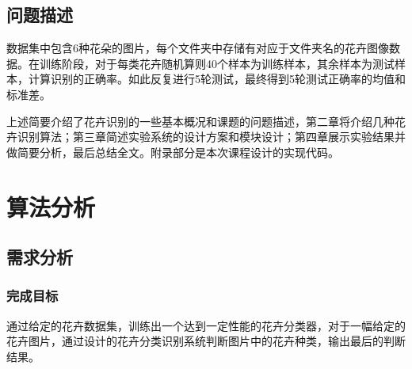 \documentclass[supercite]{HustGraduPaper}
\begin{document}
\begin{sloppypar}
  \subsection{问题描述}
  数据集中包含6种花朵的图片，每个文件夹中存储有对应于文件夹名的花卉图像数据。在训练阶段，对于每类花卉随机算则40个样本为训练样本，其余样本为测试样本，计算识别的正确率。如此反复进行5轮测试，最终得到5轮测试正确率的均值和标准差。

  上述简要介绍了花卉识别的一些基本概况和课题的问题描述，第二章将介绍几种花卉识别算法；第三章简述实验系统的设计方案和模块设计；第四章展示实验结果并做简要分析，最后总结全文。附录部分是本次课程设计的实现代码。
	\section{算法分析}
  \subsection{需求分析}
  \subsubsection{完成目标}
  通过给定的花卉数据集，训练出一个达到一定性能的花卉分类器，对于一幅给定的花卉图片，通过设计的花卉分类识别系统判断图片中的花卉种类，输出最后的判断结果。

\end{sloppypar}
\end{document}
